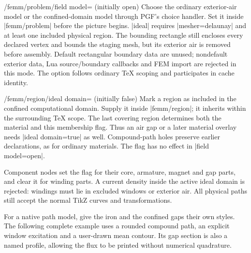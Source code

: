 \begin{key}{/femm/problem/field model= (initially open)}
Choose the ordinary exterior-air model or the confined-domain model through
PGF's choice handler. Set it inside |femm/problem| before the picture begins.
|ideal| requires |mesher=delaunay| and at least one included physical region.
The bounding rectangle still encloses every declared vertex and bounds the
staging mesh, but its exterior air is removed before assembly.
Default rectangular boundary data are unused; nondefault exterior data,
Lua source/boundary callbacks and FEM import are rejected in this mode.
The option follows ordinary TeX scoping and participates in cache identity.
\end{key}

\begin{key}{/femm/region/ideal domain= (initially false)}
Mark a region as included in the confined computational domain. Supply it
inside |femm/region|; it inherits within the surrounding TeX scope. The last
covering region determines both the material and this membership flag.
Thus an air gap or a later material overlay needs |ideal domain=true| as well.
Compound-path holes preserve earlier declarations, as for ordinary materials.
The flag has no effect in |field model=open|.

Component nodes set the flag for their core, armature, magnet and gap parts,
and clear it for winding parts. A current density inside the active ideal
domain is rejected: windings must lie in excluded windows or exterior air.
All physical paths still accept the normal TikZ curves and transformations.
\end{key}

For a native path model, give the iron and the confined gaps their own styles.
The following complete example uses a rounded compound path, an explicit
window excitation and a user-drawn mean contour. Its gap section is also a
named profile, allowing the flux to be printed without numerical quadrature.

